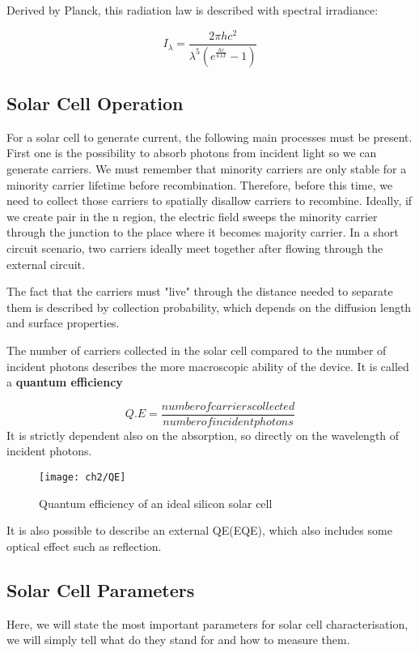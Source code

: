 Derived by Planck, this radiation law is described with spectral irradiance\cite{planck}:

\begin{equation}
I_\lambda = \frac{2\pi hc^2}{\lambda^5(e^{\frac{hc}{k\lambda T}}-1)}
\end{equation}

\subsection{Solar Cell Operation}

For a solar cell to generate current, the following main processes must be present. First one is the possibility to absorb photons from incident light so we can generate carriers. We must remember that minority carriers are only stable for a minority carrier lifetime before recombination. Therefore, before this time, we need to collect those carriers to spatially disallow carriers to recombine. Ideally, if we create pair in the n region, the electric field sweeps the minority carrier through the junction to the place where it becomes majority carrier. In a short circuit scenario, two carriers ideally meet together after flowing through the external circuit. 

The fact that the carriers must "live" through the distance needed to separate them is described by collection probability, which depends on the diffusion length and surface properties. 

The number of carriers collected in the solar cell compared to the number of incident photons describes the more macroscopic ability of the device. It is called a \textbf{quantum efficiency} 

\begin{equation}
Q.E=\frac{number  of  carriers  collected}{number  of  incident  photons}
\end{equation}
It is strictly dependent also on the absorption, so directly on the wavelength of incident photons. 

\begin{figure}
\centering
\texttt{[image: ch2/QE]}
\caption{Quantum efficiency of an ideal silicon solar cell \cite{pv}}
\end{figure}

It is also possible to describe an external QE(EQE), which also includes some optical effect such as reflection. 

\subsection{Solar Cell Parameters}
Here, we will state the most important parameters for solar cell characterisation, we will simply tell what do they stand for and how to measure them. 

